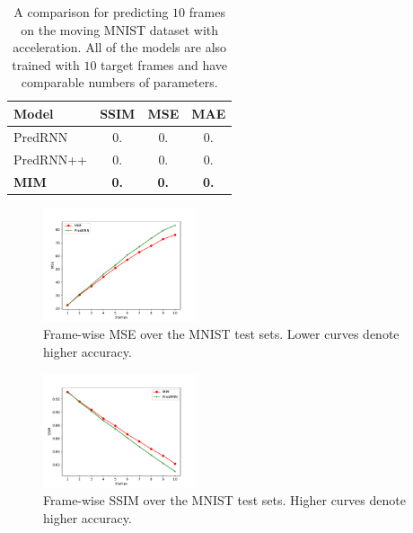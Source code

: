 \documentclass[10pt,twocolumn,letterpaper]{article}
\begin{document}
\begin{table}[h]
  \caption{A comparison for predicting $10$ frames on the moving MNIST dataset with acceleration. All of the models are also trained with $10$ target frames and have comparable numbers of parameters.}
  \label{tab:mnist_a_10_result_self}
  \vskip 0.15in
  \centering
  \begin{small}
  \begin{sc}
  \renewcommand{\multirowsetup}{\centering}  
  \begin{tabular}{lccc}
    \toprule
    Model & SSIM & MSE & MAE\\
    \midrule
    PredRNN & 0. & 0. & 0. \\
    PredRNN++ & 0. & 0. & 0. \\
    \midrule
    \textbf{MIM} & \textbf{0.} & \textbf{0.} & \textbf{0.} \\
    \bottomrule
  \end{tabular}
  \end{sc}
  \end{small}
\end{table}

\begin{figure}[h]
  \centering
  \includegraphics[width=0.4\textwidth]{fig/mnist.pdf}
  \caption{Frame-wise MSE over the MNIST test sets. Lower curves denote higher accuracy.}
  \label{fig:mnist_mse}
\end{figure}

\begin{figure}[h]
  \centering
  \includegraphics[width=0.4\textwidth]{fig/mnist_ssim.pdf}
  \caption{Frame-wise SSIM over the MNIST test sets. Higher curves denote higher accuracy.}
  \label{fig:mnist_ssim}
\end{figure}
\end{document}
